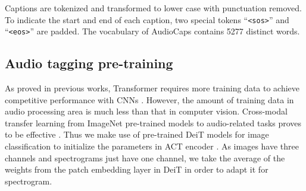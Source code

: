 \documentclass{article}
\begin{document}
\begin{sloppy}
Captions are tokenized and transformed to lower case with punctuation removed. To indicate the start and end of each caption, two special tokens ``\texttt{\textless sos\textgreater}'' and ``\texttt{\textless eos\textgreater}'' are padded. The vocabulary of AudioCaps contains \num{5277} distinct words.

\subsection{Audio tagging pre-training}
\label{ssec:pre_training}
As proved in previous works, Transformer requires more training data to achieve competitive performance with CNNs \cite{dosovitskiy2020image}. However, the amount of training data in audio processing area is much less than that in computer vision. Cross-modal transfer learning from ImageNet pre-trained models to audio-related tasks proves to be effective \cite{gong2021psla}. Thus we make use of pre-trained DeiT models for image classification to initialize the parameters in ACT encoder \cite{dosovitskiy2020image, touvron2021training}. As images have three channels and spectrograms just have one channel, we take the average of the weights from the patch embedding layer in DeiT in order to adapt it for spectrogram.


\end{sloppy}
\end{document}
